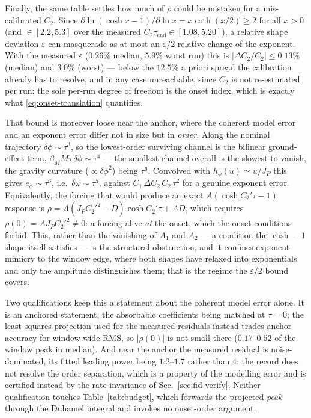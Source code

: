 Finally, the same table settles how much of $\rho$ could be mistaken for
a mis-calibrated $C_2$. Since
$\partial\ln(\cosh x - 1)/\partial\ln x = x\coth(x/2) \ge 2$ for all
$x>0$ (and $\in[2.2,5.3]$ over the measured
$C_2\tau_{\mathrm{end}} \in [1.08, 5.20]$), a relative shape deviation
$\varepsilon$ can masquerade as at most an $\varepsilon/2$ relative
change of the exponent. With the measured
$\varepsilon$ ($0.26\%$ median, $5.9\%$ worst run) this is
$|\Delta C_2/C_2| \le 0.13\%$ (median) and $3.0\%$ (worst) --- below
the $12.5\%$ a priori spread the calibration already has to resolve, and
in any case unreachable, since $C_2$ is not re-estimated per run: the
sole per-run degree of freedom is the onset index, which is exactly what
\eqref{eq:onset-translation} quantifies.

That bound is moreover loose near the anchor, where the coherent model
error and an exponent error differ not in size but in \emph{order}.
Along the nominal trajectory $\delta\phi \sim \tau^3$, so the
lowest-order surviving channel is the bilinear ground-effect term,
$\beta_M\dot M\tau\,\delta\phi \sim \tau^4$ — the smallest channel
overall is the slowest to vanish, the gravity curvature
($\propto\delta\phi^2$) being $\tau^6$. Convolved with
$h_\phi(u)\simeq u/J_P$ this gives $e_\phi\sim\tau^6$, i.e.\
$\delta\omega\sim\tau^5$, against $C_1\,\Delta C_2\,C_2\,\tau^2$ for a
genuine exponent error. Equivalently, the forcing that would produce an
exact $A(\cosh C_2'\tau - 1)$ response is
$\rho = A(J_PC_2'^2 - D)\cosh C_2'\tau + AD$, which requires
$\rho(0) = A J_P C_2'^2 \neq 0$: a forcing alive \emph{at} the onset,
which the onset conditions forbid. This, rather than the vanishing of
$A_1$ and $A_2$ — a condition the $\cosh-1$ shape itself satisfies — is
the structural obstruction, and it confines exponent mimicry to the
window edge, where both shapes have relaxed into exponentials and only
the amplitude distinguishes them; that is the regime the
$\varepsilon/2$ bound covers.

Two qualifications keep this a statement about the coherent model error
alone. It is an anchored statement, the absorbable coefficients being
matched at $\tau=0$; the least-squares projection used for the measured
residuals instead trades anchor accuracy for window-wide RMS, so
$|\rho(0)|$ is not small there ($0.17$–$0.52$ of the window peak in
median). And near the anchor the measured residual is noise-dominated,
its fitted leading power being $1.2$–$1.7$ rather than $4$: the record
does not resolve the order separation, which is a property of the
modelling error and is certified instead by the rate invariance of
Sec.~\ref{sec:fid-verify}. Neither qualification touches
Table~\ref{tab:budget}, which forwards the projected \emph{peak}
through the Duhamel integral and invokes no onset-order argument.

